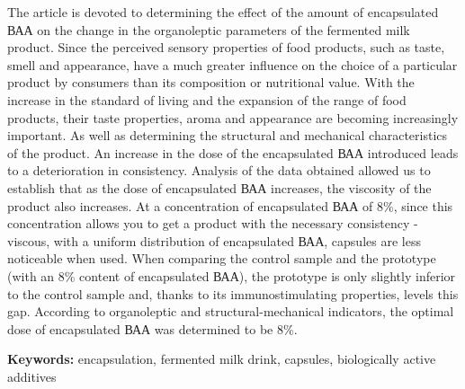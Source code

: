 \hspace{1.5em} The article is devoted to determining the effect of the amount of
encapsulated ВАА on the change in the organoleptic parameters of the
fermented milk product. Since the perceived sensory properties of food
products, such as taste, smell and appearance, have a much greater
influence on the choice of a particular product by consumers than its
composition or nutritional value. With the increase in the standard of
living and the expansion of the range of food products, their taste
properties, aroma and appearance are becoming increasingly important. As
well as determining the structural and mechanical characteristics of the
product. An increase in the dose of the encapsulated ВАА introduced
leads to a deterioration in consistency. Analysis of the data obtained
allowed us to establish that as the dose of encapsulated ВАА increases,
the viscosity of the product also increases. At a concentration of
encapsulated ВАА of 8\%, since this concentration allows you to get a
product with the necessary consistency - viscous, with a uniform
distribution of encapsulated ВАА, capsules are less noticeable when
used. When comparing the control sample and the prototype (with an 8\%
content of encapsulated ВАА), the prototype is only slightly inferior to
the control sample and, thanks to its immunostimulating properties,
levels this gap. According to organoleptic and structural-mechanical
indicators, the optimal dose of encapsulated ВАА was determined to be
8\%.

\hspace{1.5em} {\bfseries Keywords:} encapsulation, fermented milk drink, capsules,
biologically active additives

\vspace{1em}

